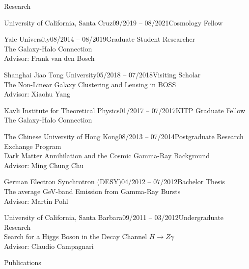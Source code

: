 \documentclass[11pt]{resume} %
\begin{document}
\begin{rSection}{Research}
  \begin{adjustwidth}{0.5cm}{}
    \begin{rSubsection}{University of California, Santa Cruz}{09/2019 -- 08/2021}{Cosmology Fellow}{}\end{rSubsection}
    \begin{rSubsection}{Yale University}{08/2014 -- 08/2019}{Graduate Student Researcher\\The Galaxy-Halo Connection\\Advisor: Frank van den Bosch}{}\end{rSubsection}
    \begin{rSubsection}{Shanghai Jiao Tong University}{05/2018 -- 07/2018}{Visiting Scholar\\The Non-Linear Galaxy Clustering and Lensing in BOSS\\Advisor: Xiaohu Yang}{}\end{rSubsection}
    \begin{rSubsection}{Kavli Institute for Theoretical Physics}{01/2017 -- 07/2017}{KITP Graduate Fellow\\The Galaxy-Halo Connection}{}\end{rSubsection}
    \begin{rSubsection}{The Chinese University of Hong Kong}{08/2013 -- 07/2014}{Postgraduate Research Exchange Program\\Dark Matter Annihilation and the Cosmic Gamma-Ray Background\\Advisor: Ming Chung Chu}{}\end{rSubsection}
    \begin{rSubsection}{German Electron Synchrotron (DESY)}{04/2012 -- 07/2012}{Bachelor Thesis\\The average GeV-band Emission from Gamma-Ray Bursts\\Advisor: Martin Pohl}{}\end{rSubsection}
    \begin{rSubsection}{University of California, Santa Barbara}{09/2011 -- 03/2012}{Undergraduate Research\\Search for a Higgs Boson in the Decay Channel $H \rightarrow Z\gamma$\\Advisor: Claudio Campagnari}{}\end{rSubsection}
  \end{adjustwidth}
\end{rSection}

\begin{rSection}{Publications}
  \setlength{\leftskip}{0.5cm}
  \nocite{14, 13, 12, 11, 10, 9, 8, 7, 6, 5, 4, 3, 2, 1}
  \printbibliography[heading=none]
\end{rSection}
\end{document}
